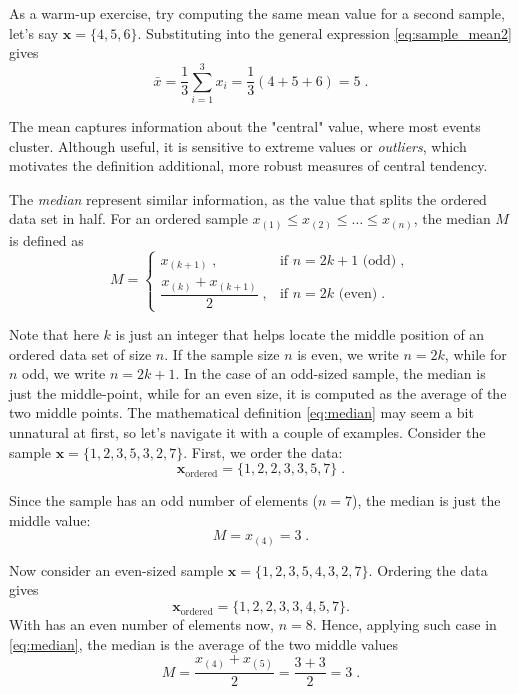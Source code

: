 \documentclass{book}
\begin{document}
As a warm-up exercise, try computing the same mean value for a second sample, let's say $\textbf{x} = \{4, 5, 6\}$. Substituting into the general expression \eqref{eq:sample_mean2} gives
\begin{equation}
	\bar{x} = \frac{1}{3} \sum_{i = 1}^{3} x_{i} = \frac{1}{3} (4 + 5 + 6) = 5 \; . \nonumber
\end{equation}

The mean captures information about the "central" value, where most events cluster. Although useful, it is sensitive to extreme values or \textit{outliers}, which motivates the definition additional, more robust measures of central tendency.

\medskip

The \textit{median} represent similar information, as the value that splits the ordered data set in half. For an ordered sample $x_{(1)} \le x_{(2)} \le \dots \le x_{(n)}$, the median $M$ is defined as
\begin{equation}
	M = \begin{cases} 
		x_{(k+1)} \; , & \text{if } n = 2k+1 \text{ (odd)} \; , \\[2mm]
		\dfrac{x_{(k)} + x_{(k+1)}}{2} \; , & \text{if } n = 2k \text{ (even)} \; .
	\end{cases}
	\label{eq:median}
\end{equation}

Note that here $k$ is just an integer that helps locate the middle position of an ordered data set of size $n$. If the sample size $n$ is even, we write $n = 2k$, while for $n$ odd, we write $n = 2k + 1$. In the case of an odd-sized sample, the median is just the middle-point, while for an even size, it is computed as the average of the two middle points. The mathematical definition \eqref{eq:median} may seem a bit unnatural at first, so let's navigate it with a couple of examples. Consider the sample $\textbf{x} = \{1, 2, 3, 5, 3, 2, 7\}$. First, we order the data: 
\begin{equation}
	\textbf{x}_{\text{ordered}} = \{1, 2, 2, 3, 3, 5, 7\} \; .
\end{equation}

Since the sample has an odd number of elements ($n = 7$), the median is just the middle value: 
\begin{equation}
	M = x_{(4)} = 3 \; .
\end{equation}

Now consider an even-sized sample $\textbf{x} = \{1, 2, 3, 5, 4, 3, 2, 7\}$. Ordering the data gives 
\begin{equation}
	\textbf{x}_{\text{ordered}} = \{1, 2, 2, 3, 3, 4, 5, 7\}.
\end{equation}
With has an even number of elements now, $n = 8$. Hence, applying such case in \eqref{eq:median}, the median is the average of the two middle values
\begin{equation}
	M = \frac{x_{(4)} + x_{(5)}}{2} = \frac{3 + 3}{2} = 3 \; .
\end{equation}
\end{document}
